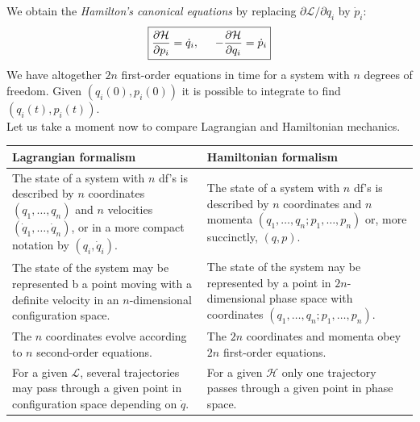 \documentclass{book}
\theoremstyle{definition}
\newcommand{\p}{\partial}
\newcommand{\lag}{\mathcal{L}}
\newcommand{\ham}{\mathcal{H}}
\newcommand{\f}[2]{\frac{#1}{#2}}
\begin{document}
We obtain the \textit{Hamilton's canonical equations} by replacing $\p \lag / \p q_i$ by $\dot{p}_i$:
\begin{align}
\boxed{\f{\p \ham}{\p p_i} = \dot{q}_i, \hspace{0.5cm} -\f{\p \ham}{\p q_i} = \dot{p}_i}
\end{align}
We have altogether $2n$ first-order equations in time for a system with $n$ degrees of freedom. Given $(q_i(0), p_i(0))$ it is possible to integrate to find $(q_i(t), p_i(t))$.\\

Let us take a moment now to compare Lagrangian and Hamiltonian mechanics.\\

\noindent 
\begin{tabular}{|p{5.5cm}|p{5.5cm}|}
	\hline
	\textbf{Lagrangian formalism} & \textbf{Hamiltonian formalism}\\
	\hline
	The state of a system with $n$ df's is described by $n$ coordinates $(q_1,\dots,q_n)$ and $n$ velocities $(\dot{q}_1,\dots,\dot{q}_n)$, or in a more compact notation by $(q_i, \dot{q}_i)$. & The state of a system with $n$ df's is described by $n$ coordinates and $n$ momenta $(q_1,\dots,q_n; p_1, \dots, p_n)$ or, more succinctly, $(q,p)$.\\
	\hline
	The state of the system may be represented b a point moving with a definite velocity in an $n$-dimensional configuration space. & The state of the system nay be represented by a point in $2n$-dimensional phase space with coordinates $(q_1,\dots,q_n; p_1, \dots, p_n)$.\\
	\hline
	The $n$ coordinates evolve according to $n$ second-order equations.&The $2n$ coordinates and momenta obey $2n$ first-order equations.\\
	\hline
	For a given $\lag$, several trajectories may pass through a given point in configuration space depending on $\dot{q}$. & For a given $\ham$ only one trajectory passes through a given point in phase space.\\
	\hline
\end{tabular}\\
\end{document}
